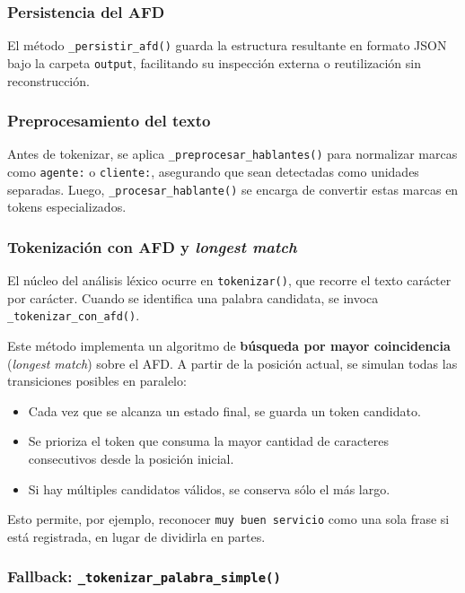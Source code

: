 \subsubsection{Persistencia del AFD}

El método \texttt{\_persistir\_afd()} guarda la estructura resultante en formato JSON bajo la
carpeta \texttt{output}, facilitando su inspección externa o reutilización sin reconstrucción.

\subsubsection{Preprocesamiento del texto}

Antes de tokenizar, se aplica \texttt{\_preprocesar\_hablantes()} para normalizar marcas como
\texttt{agente:} o \texttt{cliente:}, asegurando que sean detectadas como unidades separadas.
Luego, \texttt{\_procesar\_hablante()} se encarga de convertir estas marcas en tokens
especializados.

\subsubsection{Tokenización con AFD y \textit{longest match}}

El núcleo del análisis léxico ocurre en \texttt{tokenizar()}, que recorre el texto carácter por
carácter. Cuando se identifica una palabra candidata, se invoca
\texttt{\_tokenizar\_con\_afd()}.

Este método implementa un algoritmo de \textbf{búsqueda por mayor coincidencia}
(\textit{longest match}) sobre el AFD. A partir de la posición actual, se simulan todas las
transiciones posibles en paralelo:

\begin{itemize}
	\item Cada vez que se alcanza un estado final, se guarda un token candidato.
	\item Se prioriza el token que consuma la mayor cantidad de caracteres consecutivos desde la posición inicial.
	\item Si hay múltiples candidatos válidos, se conserva sólo el más largo.
\end{itemize}

Esto permite, por ejemplo, reconocer \texttt{muy buen servicio} como una sola frase si está
registrada, en lugar de dividirla en partes.

\subsubsection{Fallback: \texttt{\_tokenizar\_palabra\_simple()}}

